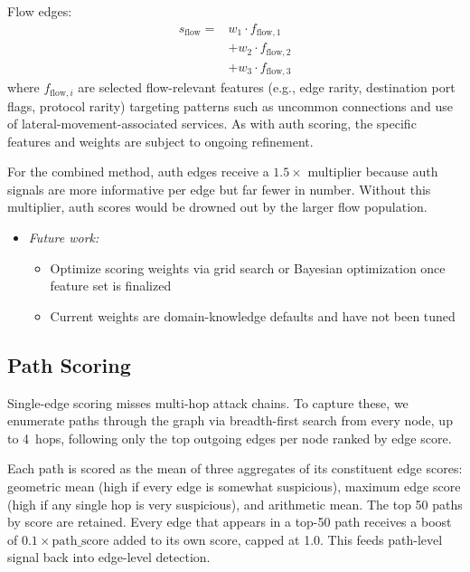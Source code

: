 \documentclass[letterpaper,twocolumn,10pt]{article}
\begin{document}
Flow edges:
\begin{equation}
\begin{aligned}
s_{\text{flow}} ={}& w_1 \cdot f_{\text{flow},1} \\
                   &+ w_2 \cdot f_{\text{flow},2} \\
                   &+ w_3 \cdot f_{\text{flow},3}
\end{aligned}
\end{equation}
where $f_{\text{flow},i}$ are selected flow-relevant features (e.g., edge rarity, destination port flags, protocol rarity) targeting patterns such as uncommon connections and use of lateral-movement-associated services. As with auth scoring, the specific features and weights are subject to ongoing refinement.

For the combined method, auth edges receive a $1.5\times$ multiplier because auth signals are more informative per edge but far fewer in number. Without this multiplier, auth scores would be drowned out by the larger flow population.

\begin{itemize}
\item \textit{Future work:}
\begin{itemize}
\item Optimize scoring weights via grid search or Bayesian optimization once feature set is finalized
\item Current weights are domain-knowledge defaults and have not been tuned
\end{itemize}
\end{itemize}

\subsection{Path Scoring}

Single-edge scoring misses multi-hop attack chains. To capture these, we enumerate paths through the graph via breadth-first search from every node, up to 4~hops, following only the top outgoing edges per node ranked by edge score.

Each path is scored as the mean of three aggregates of its constituent edge scores: geometric mean (high if every edge is somewhat suspicious), maximum edge score (high if any single hop is very suspicious), and arithmetic mean. The top 50 paths by score are retained. Every edge that appears in a top-50 path receives a boost of $0.1 \times \text{path\_score}$ added to its own score, capped at 1.0. This feeds path-level signal back into edge-level detection.
\end{document}
